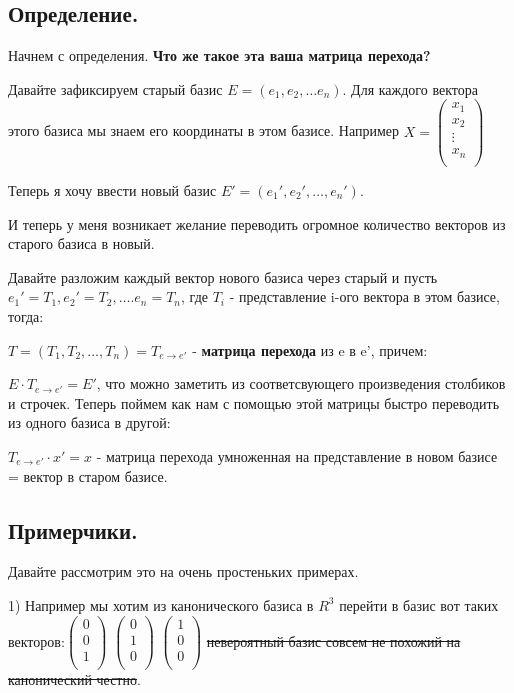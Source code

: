 \documentclass{article}
\begin{document}
\subsection{Определение.}

Начнем с определения. \textbf{Что же такое эта ваша матрица перехода?}

Давайте зафиксируем старый базис $E = (e_1,e_2,\ldots e_n)$. Для каждого вектора этого базиса мы знаем его координаты в этом базисе. Например $X= 
\begin{pmatrix}
    x_1\\
    x_2\\
    \vdots\\
    x_n\\
\end{pmatrix}
$

Теперь я хочу ввести новый базис $E' = (e_1',e_2',\ldots,e_n')$.  

И теперь у меня возникает желание переводить огромное количество векторов  из старого базиса в новый.

Давайте разложим каждый вектор нового базиса через старый и пусть $e_1' = T_1, e_2' = T_2, \ldots. e_n = T_n$, где $T_i$ - представление i-ого вектора в этом базисе, тогда:

$T=(T_1, T_2,\ldots, T_n) = T_{e\rightarrow e'}$ - \textbf{матрица перехода} из e в e', причем:

$E \cdot  T_{e\rightarrow e'} = E' $, что можно заметить из соответсвующего произведения столбиков и строчек. Теперь поймем как нам с помощью этой матрицы быстро переводить из одного базиса в другой:

$ T_{e\rightarrow e'} \cdot x' = x$ - матрица перехода умноженная на представление в новом базисе = вектор в старом базисе. 

\subsection{Примерчики.}
Давайте рассмотрим это на очень простеньких примерах.

1) Например мы хотим из канонического базиса в $R^3$ перейти  в базис вот таких векторов:$\begin{pmatrix}
    0\\
    0\\
    1\\
\end{pmatrix}$ $\begin{pmatrix}
    0\\
    1\\
    0\\
\end{pmatrix}$ $\begin{pmatrix}
    1\\
    0\\
    0\\
\end{pmatrix}$
\sout{невероятный базис совсем не похожий на канонический честно}.
\end{document}
